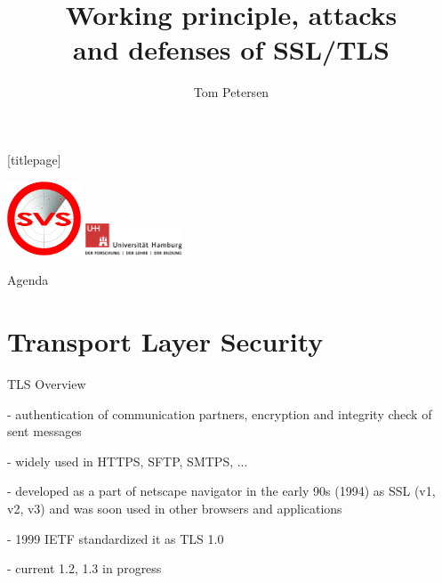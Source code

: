 


\title{Working principle, attacks\\ and defenses of SSL/TLS}
\author[Tom Petersen]{Tom Petersen}
\date{}%



\begingroup
	[titlepage]
	\begin{frame}[plain]
		\vskip8mm
		\includegraphics[width=2.2cm]{pic/svs_logo_hires-ohne-was.png}
		 \vskip-20mm %
		\titlepage
		\vspace{\fill}
		\includegraphics[width=2.9cm]{pic/UHH-Logo_2010_Farbe_RGB_hires_nomargin.png}
		\vskip20pt
	\end{frame}
\endgroup

\begin{frame}{Agenda}
	\tableofcontents
\end{frame}

\section{Transport Layer Security}

\begin{frame}{TLS Overview}

- authentication of communication partners, encryption and integrity check of sent messages

- widely used in HTTPS, SFTP, SMTPS, ... 

- developed as a part of netscape navigator in the early 90s (1994) as SSL (v1, v2, v3) and was soon used in other browsers and applications

- 1999 IETF standardized it as TLS 1.0

- current 1.2, 1.3 in progress

\end{frame}

